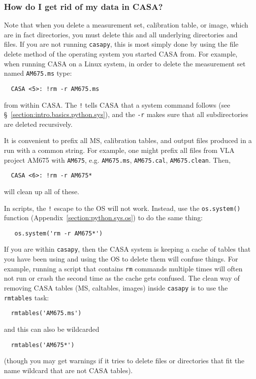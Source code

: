 \subsubsection{How do I get rid of my data in CASA?}
\label{section:intro.common.data.delete}

Note that when you delete a measurement set, calibration table, or 
image, which are in fact directories, you must delete this and all underlying
directories and files.  If you are not running {\tt casapy}, this is
most simply done by using the file delete method of the operating
system you started CASA from.  For example, when running CASA on a
Linux system, in order to delete the measurement set named 
{\tt AM675.ms} type:
\small
\begin{verbatim}
  CASA <5>: !rm -r AM675.ms
\end{verbatim}
\normalsize
from within CASA.  The {\tt !} tells CASA that a system command
follows (see \S~\ref{section:intro.basics.python.sys}),
and the {\tt -r} makes sure that all subdirectories are deleted
recursively. 

It is convenient to prefix all MS, calibration tables,
and output files produced in a run with a common string.  For example,
one might prefix all files from VLA project AM675 with {\tt AM675},
e.g. {\tt AM675.ms}, {\tt AM675.cal}, {\tt AM675.clean}.  Then,
\small
\begin{verbatim}
  CASA <6>: !rm -r AM675*
\end{verbatim}
\normalsize
will clean up all of these.

In scripts, the {\tt !} escape to the OS will not work.  Instead,
use the {\tt os.system()} function
(Appendix~\ref{section:python.sys.os}) to do the same thing:
\small
\begin{verbatim}
   os.system('rm -r AM675*')
\end{verbatim}
\normalsize

If you are within {\tt casapy}, then the CASA system is keeping
a cache of tables that you have been using and using the OS to
delete them will confuse things.  For example, running a script
that contains {\tt rm} commands multiple times will often not
run or crash the second time as the cache gets confused.  The
clean way of removing CASA tables (MS, caltables, images) 
inside {\tt casapy} is to use the {\tt rmtables} task:
\small
\begin{verbatim}
  rmtables('AM675.ms')
\end{verbatim}
\normalsize
and this can also be wildcarded
\small
\begin{verbatim}
  rmtables('AM675*')
\end{verbatim}
\normalsize
(though you may get warnings if it tries to delete files or
directories that fit the name wildcard that are not CASA tables).

